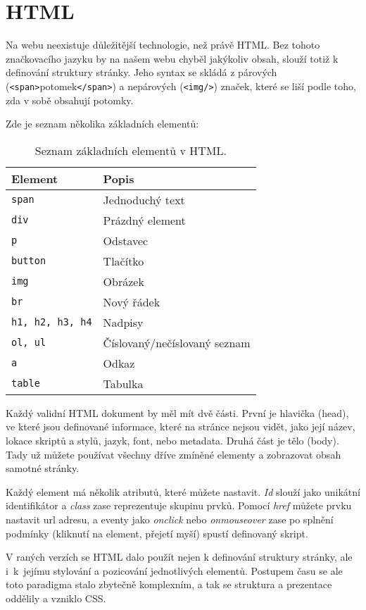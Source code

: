 \section{HTML}

Na webu neexistuje důležitější technologie, než právě HTML. Bez tohoto značkovacího jazyku by na našem webu chyběl jakýkoliv obsah, slouží totiž k definování struktury stránky. Jeho syntax se skládá z párových (\texttt{<span>}potomek\texttt{</span>}) a nepárových (\texttt{<img/>}) značek, které se liší podle toho, zda v sobě obsahují potomky.

Zde je seznam několika základních elementů:

\begin{table}[h!]
\centering
\begin{tabular}{|>{\centering\arraybackslash}m{4cm}|>{\centering\arraybackslash}m{5cm}|}
\hline
\textbf{Element} & \textbf{Popis} \\ \hline
\texttt{span} & Jednoduchý text \\ \hline
\texttt{div} & Prázdný element \\ \hline
\texttt{p} & Odstavec \\ \hline
\texttt{button} & Tlačítko \\ \hline
\texttt{img} & Obrázek \\ \hline
\texttt{br} & Nový řádek \\ \hline
\texttt{h1, h2, h3, h4} & Nadpisy \\ \hline
\texttt{ol, ul} & Číslovaný/nečíslovaný seznam \\ \hline
\texttt{a} & Odkaz \\ \hline
\texttt{table} & Tabulka \\ \hline
\end{tabular}
\caption{Seznam základních elementů v HTML.}
\end{table}

Každý validní HTML dokument by měl mít dvě části. První je hlavička (head), ve které jsou definované informace, které na stránce nejsou vidět, jako její název, lokace skriptů a stylů, jazyk, font, nebo metadata. Druhá část je tělo (body). Tady už můžete používat všechny dříve zmíněné elementy a zobrazovat obsah samotné stránky.

Každý element má několik atributů, které můžete nastavit. \textit{Id} slouží jako unikátní identifikátor a \textit{class} zase reprezentuje skupinu prvků. Pomocí \textit{href} můžete prvku nastavit url adresu, a eventy jako \textit{onclick} nebo \textit{onmouseover} zase po splnění podmínky (kliknutí na element, přejetí myší) spustí definovaný skript.

V raných verzích se HTML dalo použít nejen k definování struktury stránky, ale i~k~jejímu stylování a pozicování jednotlivých elementů. Postupem času se ale toto paradigma stalo zbytečně komplexním, a tak se struktura a prezentace oddělily a vzniklo CSS.